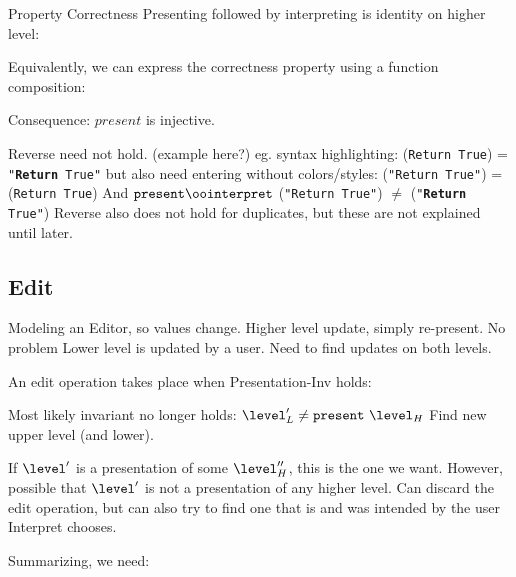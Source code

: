 
\bl
\* Property Correctness 
\* Presenting followed by interpreting is identity on higher level: 
\el


Equivalently, we can express the correctness property using a function composition: 


\bl
\* Consequence: $present$ is injective. 
\el

\bl
\* Reverse need not hold.  (example here?)
\* eg. syntax highlighting: \present ({\tt Return True}) = {\tt "{\bf Return} True"}
\* but also need entering without colors/styles: \interpret ({\tt "Return True"}) = ({\tt Return True})
\* And $\present \oo \interpret$ ({\tt "Return True"}) $\neq$ ({\tt "{\bf Return} True"}) 
\* Reverse also does not hold for duplicates, but these are not explained until later.
\el

\subsection{Edit}

\bl
\* Modeling an Editor, so values change.
\* Higher level update, simply re-present. No problem
\* Lower level is updated by a user. Need to find updates on both levels.
\el

An edit operation takes place when {\sc Presentation-Inv} holds:


\bl
\* Most likely invariant no longer holds: $\level'_{L} \neq \present~\level_{H}$
\* Find new upper level (and lower).
\el

\bl 
\* If  $\level'$ is a presentation of some $\level''_H$, this is the one we want.
\* However, possible that $\level'$ is not a presentation of any higher level. 
\* Can discard the edit operation, but can also try to find one that is and was intended by the user
\* Interpret chooses.
\el

Summarizing, we need:


